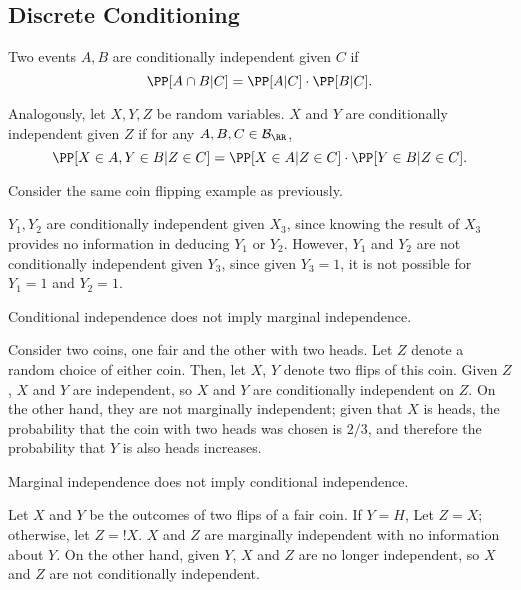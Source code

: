 \subsection{Discrete Conditioning}

\begin{definition}

Two events $A,B$ are conditionally independent given $C$ if 
\[\PP[A\cap B | C] = \PP[A | C]\cdot \PP[B | C].\]

Analogously, let $X,Y,Z$ be random variables. $X$ and $Y$ are conditionally independent given $Z$ if for any $A,B,C\in \mathcal{B}_{\RR}$, 
\[\PP[X\in A, Y\in B | Z\in C] = \PP[X\in A | Z\in C] \cdot \PP[Y\in B | Z\in C].\]
\end{definition}

\begin{example}
\exlabel

Consider the same coin flipping example as previously.
\end{example}

$Y_1,Y_2$ are conditionally independent given $X_3$, since knowing the result of $X_3$ provides no information in deducing $Y_1$ or $Y_2$. However, $Y_1$ and $Y_2$ are not conditionally independent given $Y_3$, since given $Y_3=1$, it is not possible for $Y_1=1$ and $Y_2=1$. 

\begin{example}
\exlabel

Conditional independence does not imply marginal independence. 
\end{example}

Consider two coins, one fair and the other with two heads. Let $Z$ denote a random choice of either coin. Then, let $X$, $Y$ denote two flips of this coin. Given $Z$, $X$ and $Y$ are independent, so $X$ and $Y$ are conditionally independent on $Z$. On the other hand, they are not marginally independent; given that $X$ is heads, the probability that the coin with two heads was chosen is $2/3$, and therefore the probability that $Y$ is also heads increases. 

\begin{example}
\exlabel

Marginal independence does not imply conditional independence.
\end{example}

Let $X$ and $Y$ be the outcomes of two flips of a fair coin. If $Y=H$, Let $Z=X$; otherwise, let $Z=!X$. $X$ and $Z$ are marginally independent with no information about $Y$. On the other hand, given $Y$, $X$ and $Z$ are no longer independent, so $X$ and $Z$ are not conditionally independent.

